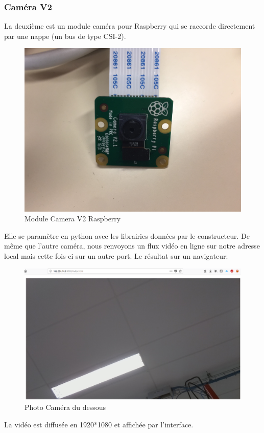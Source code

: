 \documentclass[a4paper,11pt]{report}
\begin{document}
				\subsubsection{Caméra V2}
					La deuxième est un module caméra pour Raspberry \cite{ref2} qui se raccorde directement par une nappe (un bus de type CSI-2). 
					\begin{figure}[!h]
					\begin{center}
						\includegraphics[scale=0.1]{Photos/Camera21.jpg}
						\caption{Module Camera V2 Raspberry}
					\end{center}
				\end{figure}
				\newline Elle se paramètre en python avec les librairies données par le constructeur. De même que l'autre caméra, nous renvoyons un flux vidéo en ligne sur notre adresse local \cite{ref3} mais cette fois-ci sur un autre port.
				\newline
				\newline Le résultat sur un navigateur:
					\begin{figure}[!h]
					\begin{center}
						\includegraphics[scale=0.3]{Photos/Camera2.png}
						\caption{Photo Caméra du dessous}
					\end{center}
				\end{figure}
				\newline La vidéo est diffusée en 1920*1080 et affichée par l'interface.
				\newpage
		
\end{document}
